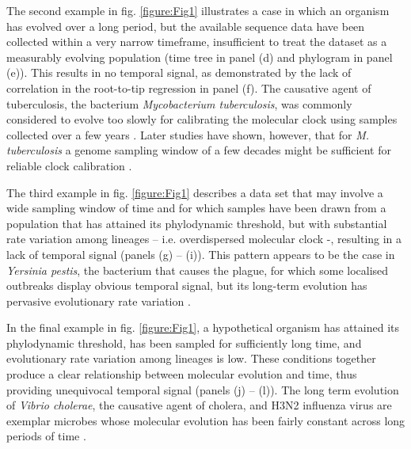 \documentclass[11pt]{article}
\begin{document}
The second example in fig. \ref{figure:Fig1} illustrates a case in which an organism has evolved over a long period, but the available sequence data have been collected within a very narrow timeframe, insufficient to treat the dataset as a measurably evolving population (time tree in panel (d) and phylogram in panel (e)). This results in no temporal signal, as demonstrated by the lack of correlation in the root-to-tip regression in panel (f). The causative agent of tuberculosis, the bacterium \textit{Mycobacterium tuberculosis}, was commonly considered to evolve too slowly for calibrating the molecular clock using samples collected over a few years \cite{duchene2016genome}. Later studies have shown, however, that for \textit{M. tuberculosis} a genome sampling window of a few decades might be sufficient for reliable clock calibration \citep{menardo2019molecular, kuhnert2018tuberculosis, merker2022transcontinental}. 
 
The third example in fig. \ref{figure:Fig1} describes a data set that may involve a wide sampling window of time and for which samples have been drawn from a population that has attained its phylodynamic threshold, but with substantial rate variation among lineages – i.e. overdispersed molecular clock -,  resulting in a lack of temporal signal (panels (g) – (i)). This pattern appears to be the case in \textit{Yersinia pestis}, the bacterium that causes the plague, for which some localised outbreaks display obvious temporal signal, but its long-term evolution has pervasive evolutionary rate variation \citep{eaton2023plagued, andrades2022stone}. 

In the final example in fig. \ref{figure:Fig1}, a hypothetical organism has attained its phylodynamic threshold, has been sampled for sufficiently long time, and evolutionary rate variation among lineages is low. These conditions together produce a clear relationship between molecular evolution and time, thus providing unequivocal temporal signal (panels (j) – (l)). The long term evolution of \textit{Vibrio cholerae}, the causative agent of cholera, and H3N2 influenza virus are exemplar microbes whose molecular evolution has been fairly constant across long periods of time \citep{devault2014second, rambaut2016exploring}.
\end{document}
